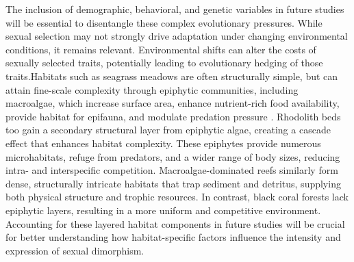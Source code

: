\documentclass[journal,article,submit,pdftex,moreauthors]{Definitions/mdpi}
\begin{document}
    		The inclusion of demographic, behavioral, and genetic variables in future studies will be essential to disentangle these complex evolutionary pressures. While sexual selection may not strongly drive adaptation under changing environmental conditions, it remains relevant. Environmental shifts can alter the costs of sexually selected traits, potentially leading to evolutionary hedging of those traits.Habitats such as seagrass meadows are often structurally simple, but can attain fine-scale complexity through epiphytic communities, including macroalgae, which increase surface area, enhance nutrient-rich food availability, provide habitat for epifauna, and modulate predation pressure \citep{leber1985influence, moksnes2008trophic}. Rhodolith beds too gain a secondary structural layer from epiphytic algae, creating a cascade effect that enhances habitat complexity. These epiphytes provide numerous microhabitats, refuge from predators, and a wider range of body sizes, reducing intra- and interspecific competition. Macroalgae-dominated reefs similarly form dense, structurally intricate habitats that trap sediment and detritus, supplying both physical structure and trophic resources. In contrast, black coral forests lack epiphytic layers, resulting in a more uniform and competitive environment. Accounting for these layered habitat components in future studies will be crucial for better understanding how habitat-specific factors influence the intensity and expression of sexual dimorphism.

\vspace{6pt} 



\end{document}
